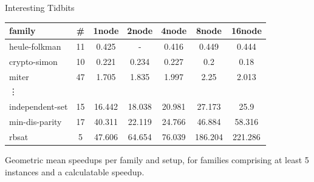 \documentclass{beamer}
\begin{document}
\begin{frame}{Interesting Tidbits}
    \centering
    \begin{table}[!h]
        \center
        \begin{tabular}{ lcccccc }
            \toprule
            family	&	\#	&	1node	&	2node	&	4node	&	8node	&	16node\\
            \midrule
            heule-folkman	&	11	&	0.425	&	-	&	0.416	&	0.449	&	0.444\\
            crypto-simon	&	10	&	0.221	&	0.234	&	0.227	&	0.2	&	0.18\\
            miter	&	47	&	1.705	&	1.835	&	1.997	&	2.25	&	2.013\\
            \vdots &&&&&&\\
            independent-set	&	15	&	16.442	&	18.038	&	20.981	&	27.173	&	25.9\\
            min-dis-parity	&	17	&	40.311	&	22.119	&	24.766	&	46.884	&	58.316\\
            rbsat	&	5	&	47.606	&	64.654	&	76.039	&	186.204	&	221.286\\
            \bottomrule
        \end{tabular}
    \end{table}
    \vfill
    Geometric mean speedups per family and setup, for families comprising at least 5 instances and a calculatable speedup.
\end{frame}
\end{document}
